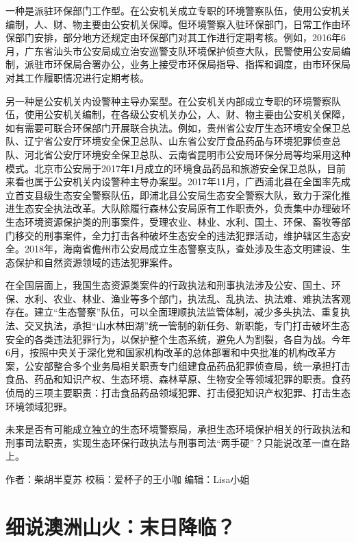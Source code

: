 \documentclass[]{book}
\begin{document}
一种是派驻环保部门工作型。在公安机关成立专职的环境警察队伍，使用公安机关编制，人、财、物主要由公安机关保障。但环境警察入驻环保部门，日常工作由环保部门安排，部分地方还规定由环保部门对其工作进行定期考核。例如，2016年6月，广东省汕头市公安局成立治安巡警支队环境保护侦查大队，民警使用公安局编制，派驻市环保局合署办公，业务上接受市环保局指导、指挥和调度，由市环保局对其工作履职情况进行定期考核。

另一种是公安机关内设警种主导办案型。在公安机关内部成立专职的环境警察队伍，使用公安机关编制，在各级公安机关办公，人、财、物主要由公安机关保障，如有需要可联合环保部门开展联合执法。例如，贵州省公安厅生态环境安全保卫总队、辽宁省公安厅环境安全保卫总队、山东省公安厅食品药品与环境犯罪侦查总队、河北省公安厅环境安全保卫总队、云南省昆明市公安局环保分局等均采用这种模式。北京市公安局于2017年1月成立的环境食品药品和旅游安全保卫总队，目前来看也属于公安机关内设警种主导办案型。2017年11月，广西浦北县在全国率先成立首支县级生态安全警察队伍，即浦北县公安局生态安全警察大队，致力于深化推进生态安全执法改革。大队除履行森林公安局原有工作职责外，负责集中办理破坏生态环境资源保护类的刑事案件，受理农业、林业、水利、国土、环保、畜牧等部门移交的刑事案件，全力打击各种破坏生态安全的违法犯罪活动，维护辖区生态安全。2018年，海南省儋州市公安局成立生态警察支队，查处涉及生态文明建设、生态保护和自然资源领域的违法犯罪案件。

在全国层面上，我国生态资源类案件的行政执法和刑事执法涉及公安、国土、环保、水利、农业、林业、渔业等多个部门，执法乱、乱执法、执法难、难执法客观存在。建立``生态警察''队伍，可以全面理顺执法监管体制，减少多头执法、重复执法、交叉执法，承担``山水林田湖''统一管制的新任务、新职能，专门打击破坏生态安全的各类违法犯罪行为，以保护整个生态系统，避免人为割裂，各自为战。今年6月，按照中央关于深化党和国家机构改革的总体部署和中央批准的机构改革方案，公安部整合多个业务局相关职责专门组建食品药品犯罪侦查局，统一承担打击食品、药品和知识产权、生态环境、森林草原、生物安全等领域犯罪的职责。食药侦局的三项主要职责：打击食品药品领域犯罪、打击侵犯知识产权犯罪、打击生态环境领域犯罪。

未来是否有可能成立独立的生态环境警察局，承担生态环境保护相关的行政执法和刑事司法职责，实现生态环保行政执法与刑事司法``两手硬''？只能说改革一直在路上。

作者：柴胡半夏苏
校稿：爱杯子的王小咖
编辑：Lisa小姐

\hypertarget{ux7ec6ux8bf4ux6fb3ux6d32ux5c71ux706bux672bux65e5ux964dux4e34}{%
\section{细说澳洲山火：末日降临？}\label{ux7ec6ux8bf4ux6fb3ux6d32ux5c71ux706bux672bux65e5ux964dux4e34}}
\end{document}
